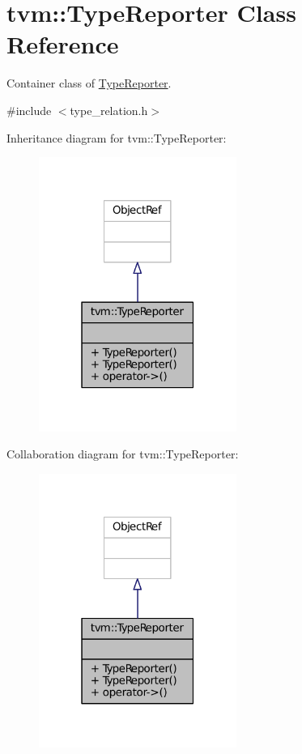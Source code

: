 \hypertarget{classtvm_1_1TypeReporter}{}\section{tvm\+:\+:Type\+Reporter Class Reference}
\label{classtvm_1_1TypeReporter}


Container class of \hyperlink{classtvm_1_1TypeReporter}{Type\+Reporter}.  




{\ttfamily \#include $<$type\+\_\+relation.\+h$>$}



Inheritance diagram for tvm\+:\+:Type\+Reporter\+:
\nopagebreak
\begin{figure}[H]
\begin{center}
\leavevmode
\includegraphics[width=183pt]{classtvm_1_1TypeReporter__inherit__graph}
\end{center}
\end{figure}


Collaboration diagram for tvm\+:\+:Type\+Reporter\+:
\nopagebreak
\begin{figure}[H]
\begin{center}
\leavevmode
\includegraphics[width=183pt]{classtvm_1_1TypeReporter__coll__graph}
\end{center}
\end{figure}
